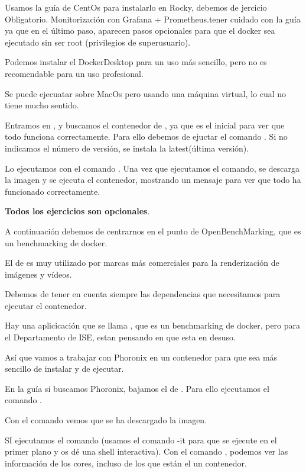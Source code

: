 Usamos la guía de CentOs para instalarlo en Rocky, debemos de jercicio Obligatorio. Monitorización con Grafana + Prometheus.tener cuidado con la guía ya que en el último paso, aparecen pasos opcionales para que el docker sea ejecutado sin ser root (privilegios de superusuario).

Podemos instalar el DockerDesktop para un uso más sencillo, pero no es recomendable para un uso profesional.

Se puede ejecuatar sobre MacOs pero usando una máquina virtual, lo cual no tiene mucho sentido.

Entramos en , y buscamos el contenedor de , ya que es el inicial para ver que todo funciona correctamente. Para ello debemos de ejuctar el comando . Si no indicamos el número de versión, se instala la latest(última versión).

Lo ejecutamos con el comando . Una vez que ejecutamos el comando, se descarga la imagen y se ejecuta el contenedor, mostrando un mensaje para ver que todo ha funcionado correctamente.

\textbf{Todos los ejercicios son opcionales}.

A continuación debemos de centrarnos en el punto de OpenBenchMarking, que es un benchmarking de docker.

El de  es muy utilizado por marcas más comerciales para la renderización de imágenes y vídeos.

Debemos de tener en cuenta siempre las dependencias que necesitamos para ejecutar el contenedor.

Hay una aplicicación que se llama , que es un benchmarking de docker, pero para el Departamento de ISE, estan pensando en que esta en desuso.

Así que vamos a trabajar con Phoronix en un contenedor para que sea más sencillo de instalar y de ejecutar.

En la guía si buscamos Phoronix, bajamos el de . Para ello ejecutamos el comando .

Con el comando  vemos que se ha descargado la imagen.

SI ejecutamos el comando  (usamos el comando -it para que se ejecute en el primer plano y os dé una shell interactiva). Con el comando , podemos ver las información de los cores, incluso de los que están el un contenedor.

